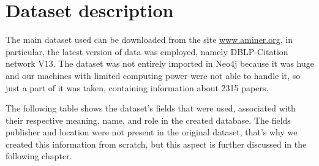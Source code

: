\chapter{Dataset description}
\label{ch:dataset_description_neo4j}%
The main dataset used can be downloaded from the site \href{https://www.aminer.org/citation}{www.aminer.org}, in particular, the latest version of data was employed, namely DBLP-Citation network V13.
The dataset was not entirely imported in Neo4j because it was huge and our machines with limited computing power were not able to handle it, so just a part of it was taken, containing information about 2315 papers.

The following table shows the dataset's fields that were used, associated with their respective meaning, name, and role in the created database.
The fields publisher and location were not present in the original dataset, that's why we created this information from scratch, but this aspect is further discussed in the following chapter.
